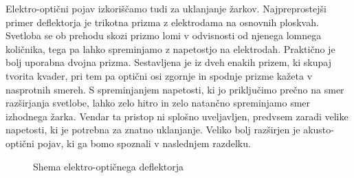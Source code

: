 \begin{remark}
Elektro-optični pojav izkoriščamo tudi za uklanjanje žarkov. 
Najpreprostejši primer deflektorja je trikotna prizma z elektrodama na osnovnih 
ploskvah. Svetloba se ob prehodu skozi prizmo lomi v odvisnosti od njenega 
lomnega količnika, tega pa lahko spreminjamo 
z napetostjo na elektrodah. Praktično je bolj uporabna dvojna prizma. Sestavljena je iz dveh enakih 
prizem, ki skupaj tvorita kvader, pri tem pa optični osi zgornje in spodnje prizme
kažeta v nasprotnih smereh. S spreminjanjem napetosti, ki jo priključimo prečno na smer
razširjanja svetlobe, lahko zelo hitro in zelo natančno spreminjamo smer izhodnega žarka. 
Vendar ta pristop ni splošno uveljavljen, predvsem zaradi velike napetosti, ki je 
potrebna za znatno uklanjanje. Veliko bolj razširjen je akusto-optični pojav, ki ga 
bomo spoznali v naslednjem razdelku. 
\begin{figure}[h]
\centering
\def\svgwidth{95truemm} 

\caption{Shema elektro-optičnega deflektorja}
\label{fig:deflshema}
\end{figure}
\end{remark}

